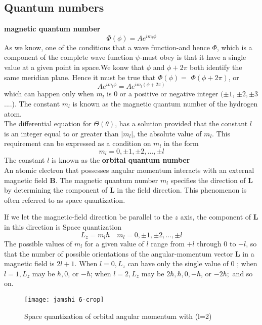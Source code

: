 \subsection{Quantum numbers}
\textbf{magnetic quantum number}
$$\Phi(\phi)=A e^{i m_{l} \phi}$$
As we know, one of the conditions that a wave function-and hence $\Phi$, which is a component of the complete wave function $\psi$-must obey is that it have a single value at a given point in space.We konw that $\phi$ and $\phi+2 \pi$ both identify the same meridian plane. Hence it must be true that $\Phi(\phi)=$ $\Phi(\phi+2 \pi)$, or
$$A e^{i m_{l} \phi}=A e^{i m_{l}(\phi+2 \pi)}$$
which can happen only when $m_{l}$ is 0 or a positive or negative integer $(\pm 1$, $\pm 2, \pm 3$....). The constant $m_{l}$ is known as the magnetic quantum number of the hydrogen atom.\\
The differential equation for $\Theta(\theta)$, has a solution provided that the constant $l$ is an integer equal to or greater than $\left|m_{l}\right|$, the absolute value of $m_{l}$. This requirement can be expressed as a condition on $m_{l}$ in the form
$$
m_{l}=0, \pm 1, \pm 2, \ldots, \pm l
$$
The constant $l$ is known as the \textbf{orbital quantum number}\\
An atomic electron that possesses angular momentum interacts with an external magnetic field $\mathbf{B}$. The magnetic quantum number $m_{l}$ specifies the direction of $\mathbf{L}$ by determining the component of $\mathbf{L}$ in the field direction. This phenomenon is often referred to as space quantization.

If we let the magnetic-field direction be parallel to the $z$ axis, the component of $\mathbf{L}$ in this direction is
Space quantization $$L_{z}=m_{l} \hbar \quad m_{l}=0, \pm 1, \pm 2, \ldots, \pm l$$
The possible values of $m_{l}$ for a given value of $l$ range from $+l$ through 0 to $-l$, so that the number of possible orientations of the angular-momentum vector $\mathbf{L}$ in a magnetic field is $2 l+1$. When $l=0, L_{z}$ can have only the single value of 0 ; when $l=1, L_{z}$ may be $\hbar, 0$, or $-\hbar$; when $l=2, L_{z}$ may be $2 \hbar, \hbar, 0,-\hbar$, or $-2 \hbar ;$ and so on.\\
\begin{figure}[H]
	\centering
	\texttt{[image: jamshi 6-crop]}
	\caption{Space quantization of orbital angular momentum with (l=2)}
	\label{}
\end{figure}
